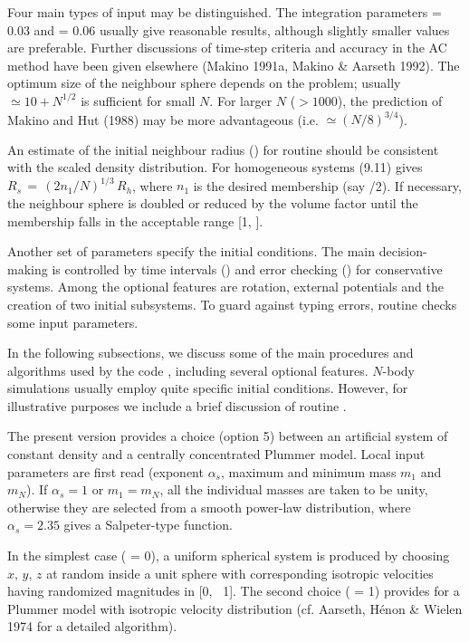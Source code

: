    Four main types of input may be distinguished.
The integration parameters  = 0.03 and  = 0.06 usually
give reasonable results, although slightly smaller values are preferable.
Further discussions of time-step criteria and accuracy in the AC method
have been given elsewhere (Makino 1991a, Makino \& Aarseth 1992).
The optimum size of the neighbour sphere depends on the problem;
usually  $\simeq 10 + N^{1/2}$ is sufficient for small $N$.
For larger $N$ ($> 1000$), the prediction of Makino and Hut (1988) may be more
advantageous (i.e.  $\simeq (N/8)^{3/4}$).

   An estimate of the initial neighbour radius () for routine
 should be consistent with the scaled density distribution.
For homogeneous systems (9.11) gives $R_s \, = \, (2 n_1 / N)^{1/3} \, R_h$,
where $n_1$ is the desired member\-ship (say /2).
If necessary, the neighbour sphere is doubled or reduced by the volume factor
until the membership falls in the acceptable range [1, ].

   Another set of parameters specify the initial conditions.
The main decision-making is controlled by time intervals ()
and error checking () for conservative systems.
Among the optional features are rotation, external potentials and the creation
of two initial subsystems.
To guard against typing errors, routine 
checks some input parameters.

In the following subsections, we discuss some of the main procedures and
algorithms used by the code , including several optional features.
$N$-body simulations usually employ quite specific initial conditions.
However, for illustrative purposes
we include a brief discussion of routine .

   The present version provides a choice (option 5) between an artificial
system of constant density and a centrally concentrated Plummer model.
Local input parameters are first read (exponent $\alpha_s$,
maximum and minimum mass $m_1$ and $m_N$).
If $\alpha_s = 1$ or $m_1 = m_N$, all the individual masses are taken to be
unity, otherwise they are selected from a smooth power-law distribution,
where $\alpha_s = 2.35$ gives a Salpeter-type function.

   In the simplest case ( = 0), a uniform spherical system is
produced by choosing $x, \, y, \, z$ at random inside a unit sphere with
corresponding isotropic velocities having randomized magnitudes in [0,~ 1].
The second choice ( = 1) provides for a Plummer model with isotropic
velocity distribution
(cf. Aarseth, H\'enon \& Wielen 1974 for a detailed algorithm).


